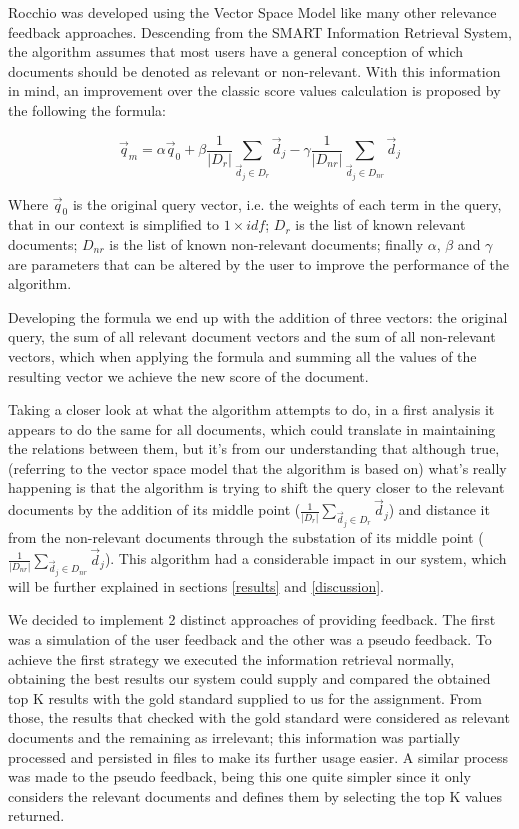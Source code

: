 \documentclass[12pt]{article}
\begin{document}
Rocchio was developed using the Vector Space Model like many other relevance 
feedback approaches. 
Descending from the SMART Information Retrieval System, the algorithm assumes 
that most users have a general conception of which documents should be denoted 
as relevant or non-relevant. 
With this information in mind, an improvement over the classic score values 
calculation is proposed by the following the formula:

\vspace{-10pt}
\begin{equation}
  \vec{q}_{m} = \alpha\vec{q}_{0} + \beta\frac{1}{|D_{r}|} \sum_{ \vec{d}_{j} \in D_{r}} \vec{d}_{j} - \gamma\frac{1}{|D_{nr}|} \sum_{ \vec{d}_{j} \in D_{nr}} \vec{d}_{j}
\end{equation}

Where $\vec{q}_{0}$ is the original query vector, i.e. the weights of each term 
in the query, that in our context is simplified to $1 \times idf$; 
$D_{r}$ is the list of known relevant documents;
$D_{nr}$ is the list of known non-relevant documents; 
finally $\alpha$, $\beta$ and $\gamma$ are parameters that can be altered by the 
user to improve the performance of the algorithm. 

Developing the formula we end up with the addition of three vectors: 
the original query, the sum of all relevant document vectors and the sum of all 
non-relevant vectors, which when applying the formula and summing all the values 
of the resulting vector we achieve the new score of the document.

Taking a closer look at what the algorithm attempts to do, in a first analysis 
it appears to do the same for all documents, which could translate in maintaining 
the relations between them, but it's from our understanding that although true, 
(referring to the vector space model that the algorithm is based on) what's 
really happening is that the algorithm is trying to shift the query closer to 
the relevant documents by the addition of its middle point 
($\frac{1}{|D_{r}|} \sum_{ \vec{d}_{j} \in D_{r}} \vec{d}_{j}$) and distance it 
from the non-relevant documents through the substation of its middle point 
($\frac{1}{|D_{nr}|} \sum_{ \vec{d}_{j} \in D_{nr}} \vec{d}_{j}$).
This algorithm had a considerable impact in our system, which will be further 
explained in sections \ref{results} and \ref{discussion}.

We decided to implement 2 distinct approaches of providing feedback.
The first was a simulation of the user feedback and the other was a pseudo feedback. 
To achieve the first strategy we executed the information retrieval normally, 
obtaining the best results our system could supply and compared the obtained 
top K results with the gold standard supplied to us for the assignment. 
From those, the results that checked with the gold standard were considered as 
relevant documents and the remaining as irrelevant; 
this information was partially processed and persisted in files to make its 
further usage easier. 
A similar process was made to the pseudo feedback, being this one quite simpler 
since it only considers the relevant documents and defines them by selecting the 
top K values returned.
\end{document}
